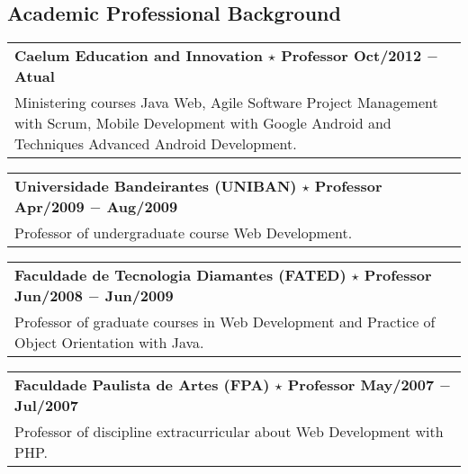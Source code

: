 \documentclass[a4paper, oneside, final]{scrartcl}
\newcommand{\vspc}{\vspace{0.15cm}} %
\begin{document}
\begin{center}
\section{Academic Professional Background}
\begin{tabularx}{1\linewidth}{X}
{\bf Caelum Education and Innovation $\star$ Professor \hfill Oct/2012 $-$ Atual} \\
Ministering courses Java Web, Agile Software Project Management with Scrum, Mobile Development with Google Android and Techniques Advanced Android Development. \vspc\\
\end{tabularx}

\begin{tabularx}{1\linewidth}{X}
{\bf Universidade Bandeirantes (UNIBAN) $\star$ Professor \hfill Apr/2009 $-$ Aug/2009} \\
Professor of undergraduate course Web Development. \vspc\\
\end{tabularx}

\begin{tabularx}{1\linewidth}{X}
{\bf Faculdade de Tecnologia Diamantes (FATED) $\star$ Professor \hfill Jun/2008 $-$ Jun/2009} \\
Professor of graduate courses in Web Development and Practice of Object Orientation with Java. \vspc\\
\end{tabularx}

\begin{tabularx}{1\linewidth}{X}
{\bf Faculdade Paulista de Artes (FPA) $\star$ Professor  \hfill May/2007 $-$ Jul/2007} \\
Professor of discipline extracurricular about Web Development with PHP. \vspc\\
\end{tabularx}



\end{center}
\end{document}
